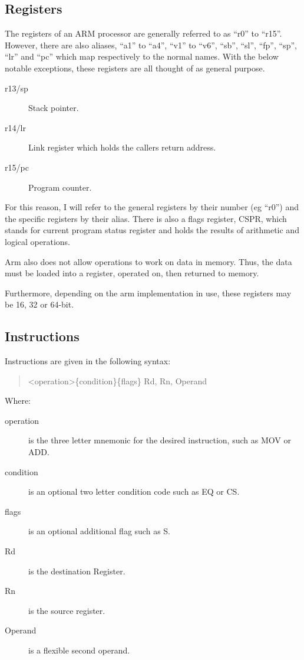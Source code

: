 			\subsection{Registers}
				The registers of an ARM processor are generally referred to as ``r0'' to ``r15''. 
				However, there are also aliases, ``a1'' to ``a4'', ``v1'' to ``v6'', ``sb'', ``sl'', ``fp'', ``sp'', ``lr'' and ``pc'' which map respectively to the normal names. 
				With the below notable exceptions, these registers are all thought of as general purpose. 
				\begin{description}
					\item[r13/sp] Stack pointer.
					\item[r14/lr] Link register which holds the callers return address. 
					\item[r15/pc] Program counter. 
				\end{description}
				For this reason, I will refer to the general registers by their number (eg ``r0'') and the specific registers by their alias. 
				There is also a flags register, CSPR, which stands for current program status register and holds the results of arithmetic and logical operations. 
				
				Arm also does not allow operations to work on data in memory. 
				Thus, the data must be loaded into a register, operated on, then returned to memory. 

				Furthermore, depending on the arm implementation in use, these registers may be 16, 32 or 64-bit. 
				
			\subsection{Instructions}
				Instructions are given in the following syntax:
				\begin{quote}
					<operation>\{condition\}\{flags\} Rd, Rn, Operand
				\end{quote}
				Where:
				\begin{description}
					\item[operation] is the three letter mnemonic for the desired instruction, such as MOV or ADD. 
					\item[condition] is an optional two letter condition code such as EQ or CS. 
					\item[flags] is an optional additional flag such as S.
					\item[Rd] is the destination Register.
					\item[Rn] is the source register. 
					\item[Operand] is a flexible second operand.
				\end{description}

